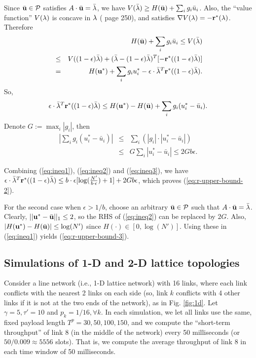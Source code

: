 \documentclass{IEEEtran}
\begin{document}
Since $\bar{{\bf u}}\in{\cal P}$ satisfies $A\cdot\bar{{\bf u}}=\bar{{\bf \lambda}}$,
we have $V(\bar{{\bf \lambda}})\ge H(\bar{{\bf u}})+\sum_{i}g_{i}\bar{u}_{i}$.
Also, the {}``value function'' $V({\bf \lambda})$ is concave in
${\bf \lambda}$ (\cite{convex-book} page 250), and satisfies $\nabla V({\bf \lambda})=-{\bf r}^{*}({\bf \lambda})$.
Therefore\begin{eqnarray*}
 &  & H(\bar{{\bf u}})+\sum_{i}g_{i}\bar{u}_{i}\le V(\bar{{\bf \lambda}})\\
 & \le & V((1-\epsilon)\bar{{\bf \lambda}})+(\bar{{\bf \lambda}}-(1-\epsilon)\bar{{\bf \lambda}})^{T}[-{\bf r}^{*}((1-\epsilon)\bar{{\bf \lambda}})]\\
 & = & H({\bf u}^{*})+\sum_{i}g_{i}u_{i}^{*}-\epsilon\cdot\bar{{\bf \lambda}}^{T}{\bf r}^{*}((1-\epsilon)\bar{{\bf \lambda}}).\end{eqnarray*}
So, \begin{equation}
\epsilon\cdot\bar{{\bf \lambda}}^{T}{\bf r}^{*}((1-\epsilon)\bar{{\bf \lambda}})\le H({\bf u}^{*})-H(\bar{{\bf u}})+\sum_{i}g_{i}(u_{i}^{*}-\bar{u}_{i}).\label{eq:ineq1}\end{equation}
Denote $G:=\max_{i}|g_{i}|$, then \begin{eqnarray}
|\sum_{i}g_{i}(u_{i}^{*}-\bar{u}_{i})| & \le & \sum_{i}(|g_{i}|\cdot|u_{i}^{*}-\bar{u}_{i}|)\nonumber \\
 & \le & G\sum_{i}|u_{i}^{*}-\bar{u}_{i}|\le2Gb\epsilon.\label{eq:ineq2}\end{eqnarray}


Combining (\ref{eq:ineq1}), (\ref{eq:ineq2}) and (\ref{eq:ineq3}),
we have $\epsilon\cdot\bar{{\bf \lambda}}^{T}{\bf r}^{*}((1-\epsilon)\bar{{\bf \lambda}})\le b\cdot\epsilon[\log(\frac{N'}{b\cdot\epsilon})+1]+2Gb\epsilon$,
which proves (\ref{eq:r-upper-bound-2}).

For the second case when $\epsilon>1/b$, choose an arbitrary $\bar{{\bf u}}\in{\cal P}$
such that $A\cdot\bar{{\bf u}}=\bar{{\bf \lambda}}$. Clearly, $||{\bf u}^{*}-\bar{{\bf u}}||_{1}\le2$,
so the RHS of (\ref{eq:ineq2}) can be replaced by $2G$. Also, $|H({\bf u}^{*})-H(\bar{{\bf u}})|\le\log(N')$
since $H(\cdot)\in[0,\log(N')]$. Using these in (\ref{eq:ineq1})
yields (\ref{eq:r-upper-bound-3}).


\subsection{Simulations of 1-D and 2-D lattice topologies}

Consider a line network (i.e., 1-D lattice network) with 16 links,
where each link conflicts with the nearest 2 links on each side (so,
link $k$ conflicts with 4 other links if it is not at the two ends
of the network), as in Fig. \ref{fig:1d}. Let $\gamma=5,\tau'=10$
and $p_{k}=1/16,\forall k$. In each simulation, we let all links
use the same, fixed payload length $T^{p}=30,50,100,150$, and we
compute the {}``short-term throughput'' of link 8 (in the middle
of the network) every 50 milliseconds (or $50/0.009\approx5556$ slots).
That is, we compute the average throughput of link 8 in each time
window of 50 milliseconds. 
\end{document}
